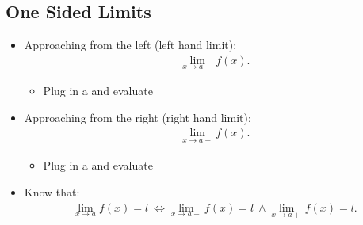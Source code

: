 \documentclass{report}
\begin{document}
    \subsection{One Sided Limits}
    \begin{itemize}
      \item Approaching from the left (left hand limit):
        \begin{align*}
          \lim\limits_{x \to a-}{f(x)}
        .\end{align*}
        \begin{itemize}
          \item Plug in a and evaluate
        \end{itemize}
      \item Approaching from the right (right hand limit):
        \begin{align*}
          \lim\limits_{x \to a+}{f(x)}
        .\end{align*}
        \begin{itemize}
          \item Plug in a and evaluate
        \end{itemize}
      \item Know that:
        \begin{align*}
          \lim\limits_{x \to a}{f(x) = l}\ \Leftrightarrow \lim\limits_{x \to a-}{f(x) = l}\ \wedge \lim\limits_{x \to a+}{f(x) = l}
        .\end{align*}
    \end{itemize}

    \bigbreak \noindent \bigbreak \noindent 
\end{document}
